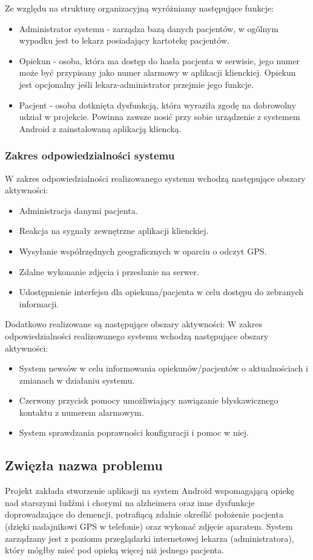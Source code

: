 \documentclass[11pt,a4paper]{article}
\begin{document}
Ze względu na strukturę organizacyjną wyróżniamy następujące funkcje:
\begin{itemize}
\item Administrator systemu - zarządza bazą danych pacjentów, w ogólnym wypadku jest to lekarz posiadający kartotekę pacjentów.
\item Opiekun - osoba, która ma dostęp do hasła pacjenta w serwisie, jego numer może być przypisany jako numer alarmowy w aplikacji klienckiej. Opiekun jest opcjonalny jeśli lekarz-administrator przejmie jego funkcje.
\item Pacjent - osoba dotknięta dysfunkcją, która wyraziła zgodę na dobrowolny udział w projekcie. Powinna zawsze nosić przy sobie urządzenie z systemem Android z zainstalowaną aplikacją kliencką.
\end{itemize}
\subsubsection {Zakres odpowiedzialności systemu}
W zakres odpowiedzialności realizowanego systemu wchodzą następujące obszary aktywności:
\begin{itemize}
\item Administracja danymi pacjenta.
\item Reakcja na sygnały zewnętrzne aplikacji klienckiej.
\item Wysyłanie współrzędnych geograficznych w oparciu o odczyt GPS.
\item Zdalne wykonanie zdjęcia i przesłanie na serwer.
\item Udostępnienie interfejsu dla opiekuna/pacjenta w celu dostępu do zebranych informacji.
\end{itemize}

Dodatkowo realizowane są następujące obszary aktywności:
W zakres odpowiedzialności realizowanego systemu wchodzą następujące obszary aktywności:
\begin{itemize}
\item System newsów w celu informowania opiekunów/pacjentów o aktualnościach i zmianach w działaniu systemu.
\item Czerwony przycisk pomocy umożliwiający nawiązanie błyskawicznego kontaktu z numerem alarmowym.
\item System sprawdzania poprawności konfiguracji i pomoc w niej.
\end{itemize}


\subsection {Zwięzła nazwa problemu}
Projekt zakłada stworzenie aplikacji na system Android wspomagającą opiekę nad starszymi ludźmi i chorymi na alzheimera oraz inne dysfunkcje doprowadzające do demencji, potrafiącą zdalnie określić położenie pacjenta (dzięki nadajnikowi GPS w telefonie) oraz wykonać zdjęcie aparatem. System zarządzany jest z poziomu przeglądarki internetowej lekarza (administratora), który mógłby mieć pod opieką więcej niż jednego pacjenta.
\end{document}
